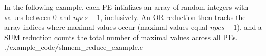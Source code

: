 \begin{apidefinition}

\begin{apiexamples}

\apicexample
    {In the following \Cstd[11] example, each \ac{PE} intializes an array of
    random integers with values between $0$ and $npes-1$, inclusively.  An OR
    reduction then tracks the array indices where maximal values occur (maximal
    values equal $npes - 1$), and a SUM reduction counts the total number of
    maximal values across all PEs.
    }
    {./example_code/shmem_reduce_example.c}
    {}

\end{apiexamples}

\end{apidefinition}
